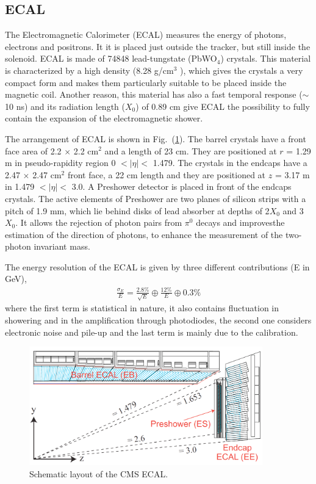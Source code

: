 \subsection{ECAL}

The Electromagnetic Calorimeter (ECAL) measures the energy of photons, electrons and positrons. It it is placed just outside the tracker, but still inside the solenoid. ECAL is made of 74848 lead-tungstate (PbWO$_{4}$) crystals. This material is characterized by a high density (8.28 g/cm$^3$ ), which gives the crystals a very compact form and makes them particularly suitable to be placed inside the magnetic coil. Another reason, this material has also a fast temporal response ($\sim$10 ns) and its radiation length ($X_{0}$) of 0.89 cm give ECAL the possibility to fully contain the expansion of the electromagnetic shower.

The arrangement of ECAL is shown in Fig.~(\ref{fig:ECAL}). The barrel crystals have a front face area of 2.2 $\times$ 2.2 cm$^2$ and a length of 23 cm. They are positioned at $r$ = 1.29 m in pseudo-rapidity region 0 $< |\eta| <$ 1.479. The crystals in the endcaps have a 2.47 $\times$ 2.47 cm$^2$ front face, a 22 cm length and they are positioned at $z$ = 3.17 m in 1.479 $< |\eta| <$ 3.0. A Preshower detector is placed in front of the endcaps crystals. The active elements of Preshower are two planes of silicon strips with a pitch of 1.9 mm, which lie behind disks of lead absorber at depths of 2$X_{0}$ and 3$X_{0}$. It allows the rejection of photon pairs from $\pi^{0}$ decays and improvesthe estimation of the direction of photons, to enhance the measurement of the two-photon invariant mass.

The energy resolution of the ECAL is given by three different contributions\cite{EcalReso} (E in GeV),
\begin{align}
\frac{\sigma_{E}}{E}=\frac{2.8\%}{\sqrt{E}}\oplus\frac{12\%}{E}\oplus 0.3\%
\end{align}
where the first term is statistical in nature, it also contains fluctuation in showering and in the amplification through photodiodes, the second one considers electronic noise and pile-up and the last term is mainly due to the calibration.

\begin{figure}[hbtp]
  \begin{center}
    \includegraphics[width=0.9\textwidth]{figure/CH2/ECAL.png}
  \end{center}
  \caption{\label{fig:ECAL}Schematic layout of the CMS ECAL.}
\end{figure}


